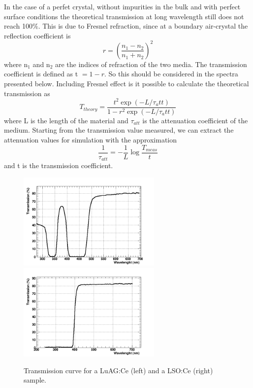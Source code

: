 In the case of a perfet crystal, without impurities in the bulk and with perfect surface conditions the theoretical transmission at long wavelength still does not reach 100$\%$. This is due to Fresnel refraction, since at a boundary air-crystal the reflection coefficient is
\begin{equation}
r = \left( \frac{n_{1}-n_{2}}{n_{1}+n_{2}} \right) ^{2}
\end{equation}
where n$_{1}$ and n$_{2}$ are the indices of refraction of the two media. The transmission coefficient is defined as t $= 1-r$.
So this should be considered in the spectra presented below.
Including Fresnel effect is it possible to calculate the theoretical transmission as
\begin{equation}
T_{theory}=\frac{t^{2} \exp{\left( -L/\tau {_att} \right)}}{1-r^{2}\exp{\left( -L/\tau {_att} \right)}}
\end{equation}
where L is the length of the material and $\tau _{att}$ is the attenuation coefficient of the medium.
Starting from the transmission value measured, we can extract the attenuation values for simulation with the approximation
\begin{equation}
\frac{1}{\tau _{att}} = -\frac{1}{L} \log{\frac{T_{meas}}{t}}
\end{equation}
and t is the transmission coefficient.
\begin{figure}[htbp]
\begin{center}
\includegraphics[width=7cm]{../Pictures/Chapter_5/trans_luag.png}
\includegraphics[width=7cm]{../Pictures/Chapter_5/lso_trans.png}
\end{center}
\caption[Transmission curve for LuAG and LSO]{Transmission curve for a LuAG:Ce (left) and a LSO:Ce (right) sample.}
\label{fig:luag_lso_trans}
\end{figure}

